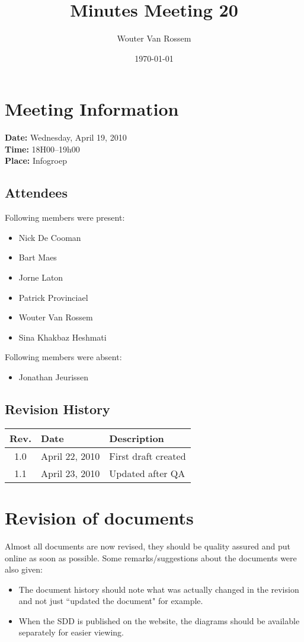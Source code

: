 \documentclass[a4paper, 12pt]{article}
\begin{document}
\title{Minutes Meeting 20}
\author{Wouter Van Rossem}
\date{\today}

\maketitle	
	\section{Meeting Information}
		\textbf{Date:} Wednesday, April 19, 2010\\
		\textbf{Time:} 18H00--19h00\\
		\textbf{Place:} Infogroep\\
		\subsection{Attendees}
Following members were present:
			\begin{itemize}
				\item Nick De Cooman				
				\item Bart Maes
				\item Jorne Laton
				\item Patrick Provinciael
				\item Wouter Van Rossem
				\item Sina Khakbaz Heshmati
			\end{itemize}
Following members were absent:
			\begin{itemize}
			 	\item Jonathan Jeurissen
			\end{itemize}
			
		\subsection{Revision History}
			\begin{tabular}{c | l | l }
				\textbf{Rev.} & \textbf{Date} & \textbf{Description} \\
				\hline
				1.0 & April 22, 2010 & First draft created \\
				1.1 & April 23, 2010 & Updated after QA \\
			\end{tabular}		

	\section{Revision of documents}
		Almost all documents are now revised, they should be quality assured and put online as soon as possible. Some remarks/suggestions about the documents were also given:
		\begin{itemize}
			 \item The document history should note what was actually changed in the revision and not just ``updated the document" for example.	
			 \item When the SDD is published on the website, the diagrams should be available separately for easier viewing.	
		\end{itemize}
		
\end{document}
